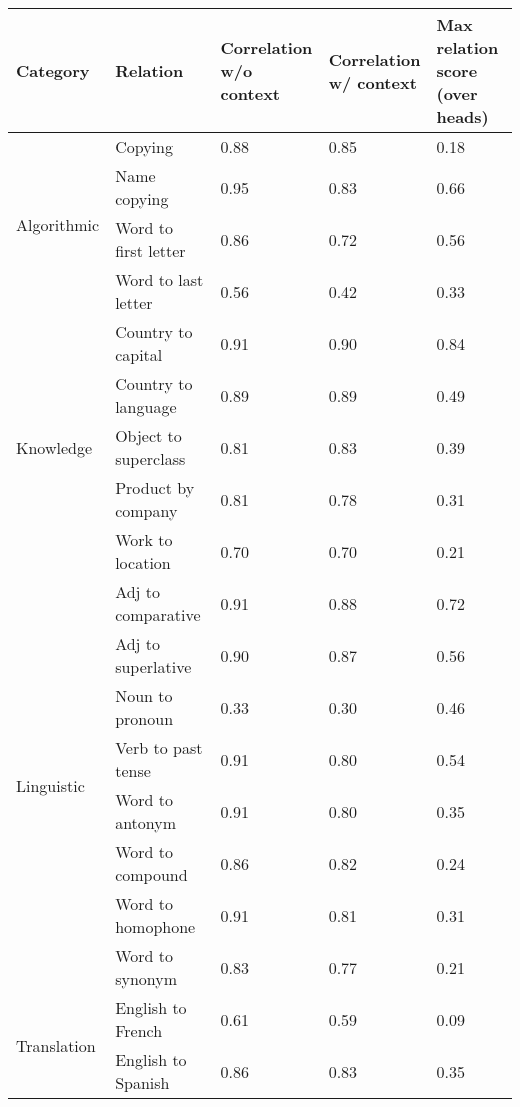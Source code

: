 \begin{tabular}{lllll}
\toprule
Category & Relation & \makecell{Correlation\\w/o context} & \makecell{Correlation\\w/ context} & \makecell{Max relation score\\(over heads)} \\
\midrule
\multirow{4}{*}{Algorithmic} & Copying & 0.88 & 0.85 & 0.18 \\
 & Name copying & 0.95 & 0.83 & 0.66 \\
 & Word to first letter & 0.86 & 0.72 & 0.56 \\
 & Word to last letter & 0.56 & 0.42 & 0.33 \\
 \midrule
\multirow{5}{*}{Knowledge} & Country to capital & 0.91 & 0.90 & 0.84 \\
 & Country to language & 0.89 & 0.89 & 0.49 \\
 & Object to superclass & 0.81 & 0.83 & 0.39 \\
 & Product by company & 0.81 & 0.78 & 0.31 \\
 & Work to location & 0.70 & 0.70 & 0.21 \\
 \midrule
\multirow{8}{*}{Linguistic} & Adj to comparative & 0.91 & 0.88 & 0.72 \\
 & Adj to superlative & 0.90 & 0.87 & 0.56 \\
 & Noun to pronoun & 0.33 & 0.30 & 0.46 \\
 & Verb to past tense & 0.91 & 0.80 & 0.54 \\
 & Word to antonym & 0.91 & 0.80 & 0.35 \\
 & Word to compound & 0.86 & 0.82 & 0.24 \\
 & Word to homophone & 0.91 & 0.81 & 0.31 \\
 & Word to synonym & 0.83 & 0.77 & 0.21 \\
 \midrule
\multirow{2}{*}{Translation} & English to French & 0.61 & 0.59 & 0.09 \\
 & English to Spanish & 0.86 & 0.83 & 0.35 \\
\bottomrule
\end{tabular}
